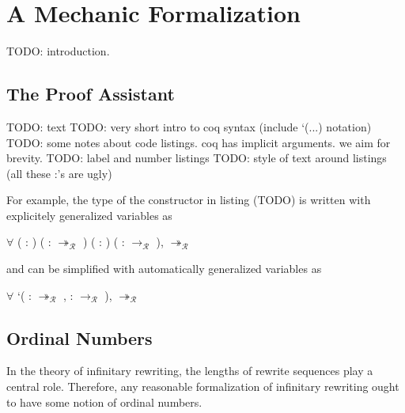 \chapter{A Mechanic Formalization}\label{chap:implementation}

TODO: introduction.


\section{The \Coq Proof Assistant}

TODO: text
TODO: very short intro to coq syntax (include `(...) notation)
TODO: some notes about code listings. coq has implicit arguments. we aim for
brevity.
TODO: label and number listings
TODO: style of text around listings (all these :'s are ugly)

For example, the type of the  constructor in listing
(TODO) is written with explicitely generalized variables as
\begin{singlespace}
\begin{coqdoccode}
\coqdocnoindent
\ensuremath{\forall} (  :
) (\coqdocvar{$\rho$}
:  $\twoheadrightarrow_\mathcal{R}$ )
( : )
(\coqdocvar{$\pi$} : 
$\rightarrow_\mathcal{R}$ ),
 $\twoheadrightarrow_\mathcal{R}$
\coqdoceol
\end{coqdoccode}
\end{singlespace}
and can be simplified with automatically generalized variables as
\begin{singlespace}
\begin{coqdoccode}
\coqdocnoindent
\ensuremath{\forall} `(\coqdocvar{$\rho$} : 
$\twoheadrightarrow_\mathcal{R}$ ,
\coqdocvar{$\pi$} :  $\rightarrow_\mathcal{R}$ ),
 $\twoheadrightarrow_\mathcal{R}$
\coqdoceol
\end{coqdoccode}
\end{singlespace}


\section{Ordinal Numbers}

In the theory of infinitary rewriting, the lengths of rewrite sequences play
a central role. Therefore, any reasonable formalization of infinitary
rewriting ought to have some notion of ordinal numbers.

